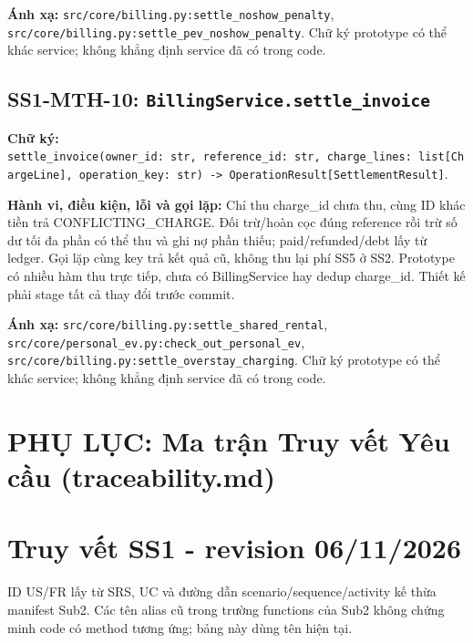 \documentclass[11pt,a4paper]{article}
\begin{document}
\textbf{Ánh xạ:} \texttt{src/core/billing.py:settle\_noshow\_penalty},
\texttt{src/core/billing.py:settle\_pev\_noshow\_penalty}. Chữ ký
prototype có thể khác service; không khẳng định service đã có trong
code.

\hypertarget{ss1-mth-10-billingservice.settle_invoice}{%
\subsection{\texorpdfstring{SS1-MTH-10:
\texttt{BillingService.settle\_invoice}}{SS1-MTH-10: BillingService.settle\_invoice}}\label{ss1-mth-10-billingservice.settle_invoice}}

\textbf{Chữ ký:}
\texttt{settle\_invoice(owner\_id:\ str,\ reference\_id:\ str,\ charge\_lines:\ list{[}ChargeLine{]},\ operation\_key:\ str)\ -\textgreater{}\ OperationResult{[}SettlementResult{]}}.

\textbf{Hành vi, điều kiện, lỗi và gọi lặp:} Chỉ thu charge\_id chưa
thu, cùng ID khác tiền trả CONFLICTING\_CHARGE. Đối trừ/hoàn cọc đúng
reference rồi trừ số dư tối đa phần có thể thu và ghi nợ phần thiếu;
paid/refunded/debt lấy từ ledger. Gọi lặp cùng key trả kết quả cũ, không
thu lại phí SS5 ở SS2. Prototype có nhiều hàm thu trực tiếp, chưa có
BillingService hay dedup charge\_id. Thiết kế phải stage tất cả thay đổi
trước commit.

\textbf{Ánh xạ:} \texttt{src/core/billing.py:settle\_shared\_rental},
\texttt{src/core/personal\_ev.py:check\_out\_personal\_ev},
\texttt{src/core/billing.py:settle\_overstay\_charging}. Chữ ký
prototype có thể khác service; không khẳng định service đã có trong
code.

\newpage
\section*{PHỤ LỤC: Ma trận Truy vết Yêu cầu (traceability.md)}
\hypertarget{truy-vux1ebft-ss1---revision-06112026}{%
\section{Truy vết SS1 - revision
06/11/2026}\label{truy-vux1ebft-ss1---revision-06112026}}

ID US/FR lấy từ SRS, UC và đường dẫn scenario/sequence/activity kế thừa
manifest Sub2. Các tên alias cũ trong trường functions của Sub2 không
chứng minh code có method tương ứng; bảng này dùng tên hiện tại.
\end{document}
